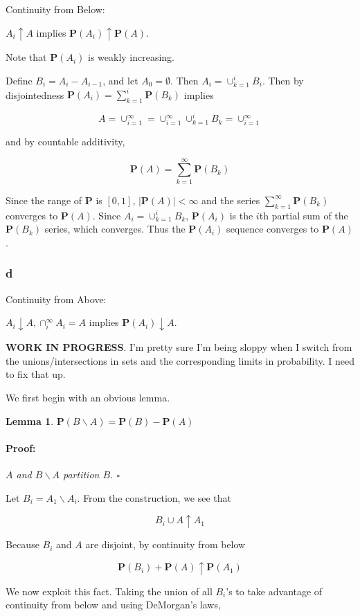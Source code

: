 \documentclass{article}
\newenvironment{proof}{\paragraph{Proof:}}{\hfill$\square$}
\newtheorem{lemma}[theorem]{Lemma}
\newcommand{\prob}{\boldsymbol{P}}
\begin{document}
Continuity from Below:

$A_i \uparrow A$ implies $\prob(A_i) \uparrow \prob(A)$.

Note that $\prob(A_i)$ is weakly increasing.

Define $B_i = A_i - A_{i-1}$, and let $A_0 = \emptyset$. Then $A_i = \cup_{k=1}^i B_i$. Then by disjointedness $\prob(A_i) = \sum_{k=1}^i \prob(B_k)$ implies

\[
A = \cup_{i=1}^\infty = \cup_{i=1}^\infty \cup_{k=1}^i B_k = \cup_{i=1}^\infty
\]

and by countable additivity,

\[
\prob(A) = \sum_{k=1}^\infty \prob(B_k)
\]

Since the range of $\prob$ is $[0, 1]$, $|\prob(A)| < \infty$ and the series $\sum_{k=1}^\infty \prob(B_k)$ converges to $\prob(A)$. Since $A_i = \cup_{k=1}^i B_k$, $\prob(A_i)$ is the $i$th partial sum of the $\prob(B_k)$ series, which converges. Thus the $\prob(A_i)$ sequence converges to $\prob(A)$.

\subsubsection*{d}

Continuity from Above:

$A_i \downarrow A, \cap_i^\infty A_i = A$ implies $\prob(A_i) \downarrow A$.

\textbf{WORK IN PROGRESS}. I'm pretty sure I'm being sloppy when I switch from the unions/intersections in sets and the corresponding limits in probability. I need to fix that up.

We first begin with an obvious lemma.

\begin{lemma}
$\prob(B\backslash A) = \prob(B) - \prob(A)$
\begin{proof}
$A$ and $B\backslash A$ partition $B$.
\end{proof}
\end{lemma}

Let $B_i = A_1 \backslash A_i$. From the construction, we see that

\[
B_i \cup A \uparrow A_1
\]

Because $B_i$ and $A$ are disjoint, by continuity from below

\[
\prob(B_i) + \prob(A) \uparrow \prob(A_1)
\]

We now exploit this fact. Taking the union of all $B_i$'s to take advantage of continuity from below and using DeMorgan's laws,
\end{document}
